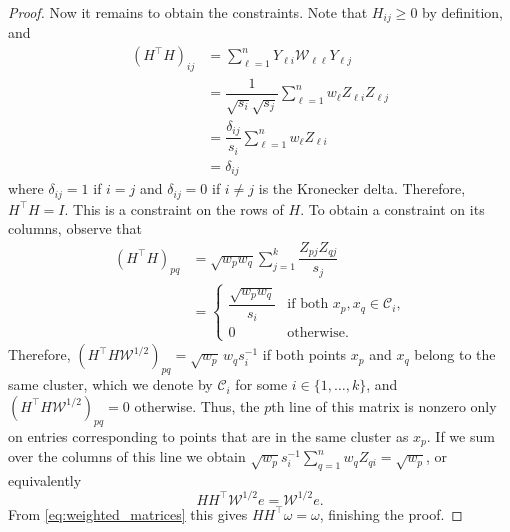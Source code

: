 \documentclass[10pt,journal,compsoc]{IEEEtran}
\newcommand\C{{\mathcal{C}}}
\newcommand\e{e}
\newcommand\om{\omega}
\begin{document}
\begin{proof}
Now it remains to obtain the constraints. 
Note that $H_{ij} \ge 0$ by definition, and
\begin{equation}
\begin{split}
(H^\top H)_{ij} &= \sum_{\ell=1}^n 
Y_{\ell i} \mathcal{W}_{\ell \ell} Y_{\ell j } \\
&= 
\dfrac{1}{\sqrt{s_i}\sqrt{s_j}} \sum_{\ell=1}^n w_\ell Z_{\ell i} Z_{\ell j}
\\
&= \dfrac{\delta_{ij}}{s_i} \sum_{\ell=1}^n w_\ell Z_{\ell i} 
\\
&= \delta_{ij}
\end{split}
\end{equation}
where $\delta_{ij}=1$ if $i=j$ and $\delta_{ij}=0$ if $i\ne j$ is the
Kronecker delta. Therefore, $H^\top H = I$. 
This is a constraint on the rows of $H$.
To obtain a constraint on its columns,
observe that
\begin{equation}
\begin{split}
\left(H^\top H\right)_{pq} &= \sqrt{w_p w_q}\sum_{j=1}^k \dfrac{Z_{pj}
Z_{qj}}{s_j} \\
& = \begin{cases}
\dfrac{\sqrt{w_p w_q}}{s_i} & \mbox{if both $x_p,x_q \in \C_i$,} \\
0 & \mbox{otherwise}.
\end{cases}
\end{split}
\end{equation}
Therefore, $(H^\top H \mathcal{W}^{1/2})_{pq} = \sqrt{w_p} \, w_q s_i^{-1}$
if both points $x_p$ and $x_q$ belong to the same cluster, which
we denote by $\C_i$ for some $i\in\{1,\dotsc,k\}$, and 
$(H^\top H \mathcal{W}^{1/2})_{pq} = 0 $ otherwise. Thus, the $p$th
line of this matrix is nonzero only on entries corresponding to points
that are in the same cluster as $x_p$. If we sum over the columns of this
line we obtain $\sqrt{w_p} s_i^{-1} \sum_{q=1}^n w_q Z_{qi} = \sqrt{w_p}$,
or equivalently 
\begin{equation}
H H^\top \mathcal{W}^{1/2} \e = \mathcal{W}^{1/2} \e.
\end{equation}
From \eqref{eq:weighted_matrices} this
gives $H H^\top \om = \om$, finishing the proof.
\end{proof}
\end{document}
